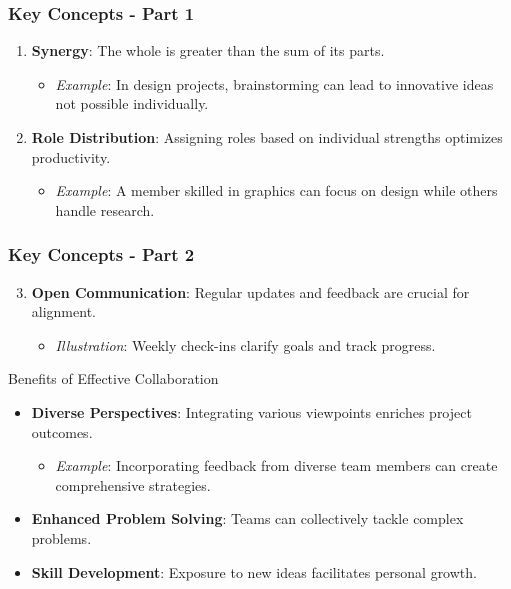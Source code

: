 \documentclass[aspectratio=169]{beamer}
\begin{document}
\begin{frame}[fragile]
    \frametitle{Key Concepts - Part 1}
    \begin{enumerate}
        \item \textbf{Synergy}: The whole is greater than the sum of its parts.
            \begin{itemize}
                \item \textit{Example}: In design projects, brainstorming can lead to innovative ideas not possible individually.
            \end{itemize}
        \item \textbf{Role Distribution}: Assigning roles based on individual strengths optimizes productivity.
            \begin{itemize}
                \item \textit{Example}: A member skilled in graphics can focus on design while others handle research.
            \end{itemize}
    \end{enumerate}
\end{frame}

\begin{frame}[fragile]
    \frametitle{Key Concepts - Part 2}
    \begin{enumerate}
        \setcounter{enumi}{2}
        \item \textbf{Open Communication}: Regular updates and feedback are crucial for alignment.
            \begin{itemize}
                \item \textit{Illustration}: Weekly check-ins clarify goals and track progress.
            \end{itemize}
    \end{enumerate}
    
    \begin{block}{Benefits of Effective Collaboration}
        \begin{itemize}
            \item \textbf{Diverse Perspectives}: Integrating various viewpoints enriches project outcomes.
                \begin{itemize}
                    \item \textit{Example}: Incorporating feedback from diverse team members can create comprehensive strategies.
                \end{itemize}
            \item \textbf{Enhanced Problem Solving}: Teams can collectively tackle complex problems.
            \item \textbf{Skill Development}: Exposure to new ideas facilitates personal growth.
        \end{itemize}
    \end{block}
\end{frame}
\end{document}
